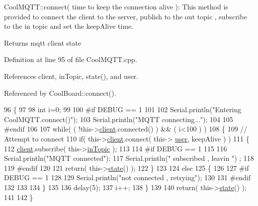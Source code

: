 Cool\+M\+Q\+T\+T\+::connect( time to keep the connection alive )\+: This method is provided to connect the client to the server, publish to the out topic , subscribe to the in topic and set the keep\+Alive time.

\begin{DoxyReturn}{Returns}
mqtt client state 
\end{DoxyReturn}


Definition at line 95 of file Cool\+M\+Q\+T\+T.\+cpp.



References client, in\+Topic, state(), and user.



Referenced by Cool\+Board\+::connect().


\begin{DoxyCode}
96 \{       
97 
98     \textcolor{keywordtype}{int} i=0;
99 
100 \textcolor{preprocessor}{#if DEBUG == 1 }
101 
102     Serial.println(\textcolor{stringliteral}{"Entering CoolMQTT.connect()"});
103     Serial.println(\textcolor{stringliteral}{"MQTT connecting..."});
104 
105 \textcolor{preprocessor}{#endif}
106 
107     \textcolor{keywordflow}{while}( ( !this->\hyperlink{classCoolMQTT_a4ca71e4f76ef868692a297efd45b1415}{client}.connected() ) && ( i<100 ) ) 
108     \{
109         \textcolor{comment}{// Attempt to connect}
110         \textcolor{keywordflow}{if}( this->\hyperlink{classCoolMQTT_a4ca71e4f76ef868692a297efd45b1415}{client}.connect( this-> \hyperlink{classCoolMQTT_a8cd47e45d457f908d4b4390b35aaee83}{user}, keepAlive ) )
111         \{
112             \hyperlink{classCoolMQTT_a4ca71e4f76ef868692a297efd45b1415}{client}.subscribe( this->\hyperlink{classCoolMQTT_a4492f52a441e83cc5151010317fdb52d}{inTopic} );
113 
114 \textcolor{preprocessor}{        #if DEBUG == 1 }
115 
116             Serial.println(\textcolor{stringliteral}{"MQTT connected"});
117             Serial.println(\textcolor{stringliteral}{" subscribed , leavin "}) ;
118         
119 \textcolor{preprocessor}{        #endif}
120 
121             \textcolor{keywordflow}{return}( this->\hyperlink{classCoolMQTT_a5d003307eff78efbd585e42b43b72b6d}{state}() );
122         \}
123 
124         \textcolor{keywordflow}{else}
125         \{
126         
127 \textcolor{preprocessor}{        #if DEBUG == 1 }
128 
129             Serial.println(\textcolor{stringliteral}{"not connected , retrying"});
130         
131 \textcolor{preprocessor}{        #endif}
132 
133             
134         \}
135 
136     delay(5);
137     i++;
138     \}
139     
140     \textcolor{keywordflow}{return}( this->\hyperlink{classCoolMQTT_a5d003307eff78efbd585e42b43b72b6d}{state}() );
141 
142 \}
\end{DoxyCode}
